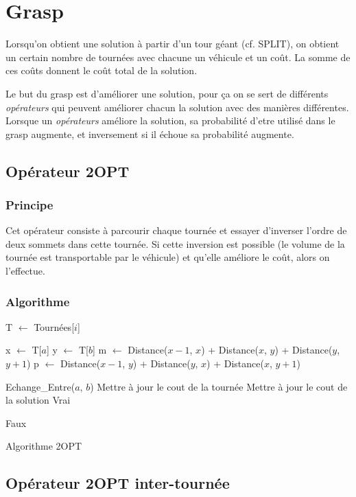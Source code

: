 \documentclass{article}
\begin{document}
\newpage
\section{Grasp}
Lorsqu'on obtient une solution à partir d'un tour géant (cf. SPLIT), on obtient un certain
nombre de tournées avec chacune un véhicule et un coût. La somme de ces coûts donnent le
coût total de la solution.

Le but du grasp est d'améliorer une solution, pour ça on se sert de différents
\emph{opérateurs} qui peuvent améliorer chacun la solution avec des manières différentes.
Lorsque un \emph{opérateurs} améliore la solution, sa probabilité d'etre utilisé dans le grasp augmente, et inversement si il échoue sa probabilité augmente.
\subsection{Opérateur 2OPT}
\subsubsection{Principe}
Cet opérateur consiste à parcourir chaque tournée et essayer d'inverser l'ordre de deux
sommets dans cette tournée. Si cette inversion est possible (le volume de la tournée est
transportable par le véhicule) et qu'elle améliore le coût, alors on l'effectue.

\subsubsection{Algorithme}
\begin{algorithm}[H]
  {
    T $\leftarrow$ Tournées[$i$]\;
    {
      {
        x $\leftarrow$ T[$a$]\;
        y $\leftarrow$ T[$b$]\;
        m $\leftarrow$ Distance($x - 1$, $x$) + Distance($x$, $y$) + Distance($y$, $y + 1$)\;
        p $\leftarrow$ Distance($x - 1$, $y$) + Distance($y$, $x$) + Distance($x$, $y + 1$)\; 
 
        {
          Echange\_Entre($a$, $b$)\;
          Mettre à jour le cout de la tournée\;
          Mettre à jour le cout de la solution\;
          \Return Vrai\;
        }
      }
    }
  }
  \Return Faux\;
  \caption{Algorithme 2OPT}
\end{algorithm}

\subsection{Opérateur 2OPT inter-tournée}
\end{document}
